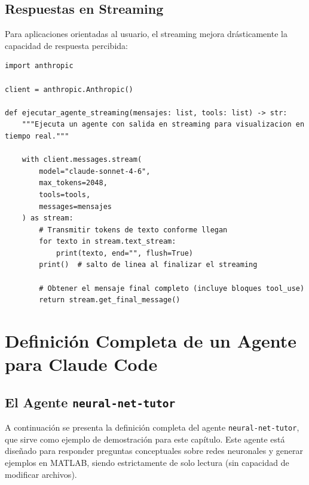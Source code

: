 \documentclass[11pt,letterpaper]{article}
\begin{document}
\subsection{Respuestas en Streaming}

Para aplicaciones orientadas al usuario, el streaming mejora drásticamente la capacidad de respuesta percibida:

\begin{lstlisting}[style=PythonStyle, caption={Agente con respuesta en streaming}]
import anthropic

client = anthropic.Anthropic()

def ejecutar_agente_streaming(mensajes: list, tools: list) -> str:
    """Ejecuta un agente con salida en streaming para visualizacion en tiempo real."""

    with client.messages.stream(
        model="claude-sonnet-4-6",
        max_tokens=2048,
        tools=tools,
        messages=mensajes
    ) as stream:
        # Transmitir tokens de texto conforme llegan
        for texto in stream.text_stream:
            print(texto, end="", flush=True)
        print()  # salto de linea al finalizar el streaming

        # Obtener el mensaje final completo (incluye bloques tool_use)
        return stream.get_final_message()
\end{lstlisting}

\section{Definición Completa de un Agente para Claude Code}

\subsection{El Agente \texttt{neural-net-tutor}}

A continuación se presenta la definición completa del agente \texttt{neural-net-tutor}, que sirve como ejemplo de demostración para este capítulo. Este agente está diseñado para responder preguntas conceptuales sobre redes neuronales y generar ejemplos en MATLAB, siendo estrictamente de solo lectura (sin capacidad de modificar archivos).
\end{document}
